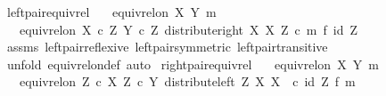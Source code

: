 \begin{isabellebody}
\isanewline
%
\endisadelimproof
\isanewline
{}\isamarkupfalse%
\ left{\isacharunderscore}{\kern0pt}pair{\isacharunderscore}{\kern0pt}equiv{\isacharunderscore}{\kern0pt}rel{\isacharcolon}{\kern0pt}\isanewline
\ \ \ {\isachardoublequoteopen}equiv{\isacharunderscore}{\kern0pt}rel{\isacharunderscore}{\kern0pt}on\ X\ {\isacharparenleft}{\kern0pt}Y{\isacharcomma}{\kern0pt}\ m{\isacharparenright}{\kern0pt}{\isachardoublequoteclose}\isanewline
\ \ \ {\isachardoublequoteopen}equiv{\isacharunderscore}{\kern0pt}rel{\isacharunderscore}{\kern0pt}on\ {\isacharparenleft}{\kern0pt}X\ {\isasymtimes}\isactrlsub c\ Z{\isacharparenright}{\kern0pt}\ {\isacharparenleft}{\kern0pt}Y\ {\isasymtimes}\isactrlsub c\ Z{\isacharcomma}{\kern0pt}\ distribute{\isacharunderscore}{\kern0pt}right\ X\ X\ Z\ {\isasymcirc}\isactrlsub c\ {\isacharparenleft}{\kern0pt}m\ {\isasymtimes}\isactrlsub f\ id\ Z{\isacharparenright}{\kern0pt}{\isacharparenright}{\kern0pt}{\isachardoublequoteclose}\isanewline
%
\isadelimproof
\ \ %
\endisadelimproof
%
\isatagproof
{}\isamarkupfalse%
\ assms\ left{\isacharunderscore}{\kern0pt}pair{\isacharunderscore}{\kern0pt}reflexive\ left{\isacharunderscore}{\kern0pt}pair{\isacharunderscore}{\kern0pt}symmetric\ left{\isacharunderscore}{\kern0pt}pair{\isacharunderscore}{\kern0pt}transitive\isanewline
\ \ \isamarkupfalse%
\ {\isacharparenleft}{\kern0pt}unfold\ equiv{\isacharunderscore}{\kern0pt}rel{\isacharunderscore}{\kern0pt}on{\isacharunderscore}{\kern0pt}def{\isacharcomma}{\kern0pt}\ auto{\isacharparenright}{\kern0pt}%
\endisatagproof
{\isafoldproof}%
%
\isadelimproof
\isanewline
%
\endisadelimproof
\isanewline
{}\isamarkupfalse%
\ right{\isacharunderscore}{\kern0pt}pair{\isacharunderscore}{\kern0pt}equiv{\isacharunderscore}{\kern0pt}rel{\isacharcolon}{\kern0pt}\isanewline
\ \ \ {\isachardoublequoteopen}equiv{\isacharunderscore}{\kern0pt}rel{\isacharunderscore}{\kern0pt}on\ X\ {\isacharparenleft}{\kern0pt}Y{\isacharcomma}{\kern0pt}\ m{\isacharparenright}{\kern0pt}{\isachardoublequoteclose}\isanewline
\ \ \ {\isachardoublequoteopen}equiv{\isacharunderscore}{\kern0pt}rel{\isacharunderscore}{\kern0pt}on\ {\isacharparenleft}{\kern0pt}Z\ {\isasymtimes}\isactrlsub c\ X{\isacharparenright}{\kern0pt}\ {\isacharparenleft}{\kern0pt}Z\ {\isasymtimes}\isactrlsub c\ Y{\isacharcomma}{\kern0pt}\ distribute{\isacharunderscore}{\kern0pt}left\ Z\ X\ X\ \ {\isasymcirc}\isactrlsub c\ {\isacharparenleft}{\kern0pt}id\ Z\ {\isasymtimes}\isactrlsub f\ m{\isacharparenright}{\kern0pt}{\isacharparenright}{\kern0pt}{\isachardoublequoteclose}\isanewline

\end{isabellebody}
